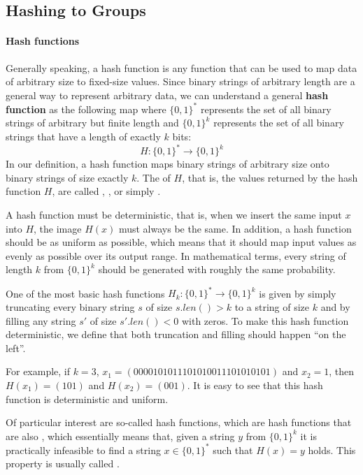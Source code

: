 \subsection{Hashing to Groups}\label{sec:hashing-to-groups}
\paragraph{Hash functions} Generally speaking, a hash function is any function that can be used to map data of arbitrary size to fixed-size values. Since binary strings of arbitrary length are a general way to represent arbitrary data, we can understand a general \textbf{hash function} as the following map where $\{0,1\}^*$ represents the set of all binary strings of arbitrary but finite length and $\{0,1\}^k$ represents the set of all binary strings that have a length of exactly $k$ bits:
\begin{equation}
H: \{0,1\}^* \to \{0,1\}^k
\end{equation}
In our definition, a hash function maps binary strings of arbitrary size onto binary strings of size exactly $k$. The  of $H$, that is, the values returned by the hash function $H$, are called , , or simply .

A hash function must be deterministic, that is, when we insert the same input $x$ into $H$, the image $H(x)$ must always be the same. In addition, a hash function should be as uniform as possible, which means that it should map input values as evenly as possible over its output range. In mathematical terms, every string of length $k$  from $\{0,1\}^k$ should be generated with roughly the same probability.
\begin{example}\label{ex:k-truncation-hash} One of the most basic hash functions
$H_k:\{0,1\}^*\to \{0,1\}^k$ is given by simply truncating every binary string $s$ of size $s.len()> k$ to a string of size $k$ and by filling any string $s'$ of size $s'.len()<0$ with zeros. To make this hash function deterministic, we define that both truncation and filling should happen ``on the left''.

For example, if $k=3$, $x_1=(0000101011101010011101010101)$ and $x_2=1$, then $H(x_1)=(101)$ and $H(x_2)=(001)$. It is easy to see that this hash function is deterministic and uniform.
\end{example}
Of particular interest are so-called  hash functions, which are hash functions that are also , which essentially means that, given a string $y$ from $\{0,1\}^k$ it is practically infeasible to find a string $x\in\{0,1\}^*$ such that $H(x)=y$ holds. This property is usually called .

